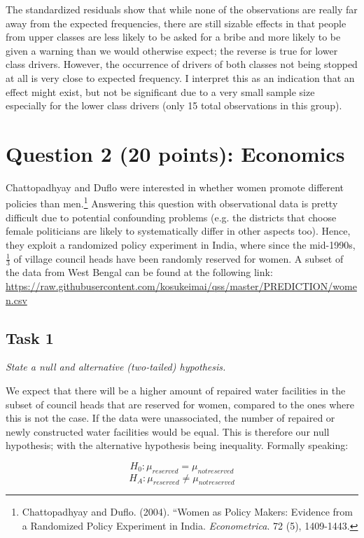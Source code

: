 \documentclass[12pt,a4paper]{article}
\begin{document}
The standardized residuals show that while none of the observations are really far away from the expected frequencies, there are still sizable effects in that people from upper classes are less likely to be asked for a bribe and more likely to be given a warning than we would otherwise expect; the reverse is true for lower class drivers. However, the occurrence of drivers of both classes not being stopped at all is very close to expected frequency. I interpret this as an indication that an effect might exist, but not be significant due to a very small sample size especially for the lower class drivers (only 15 total observations in this group).

\newpage
\section*{Question 2 (20 points): Economics}
Chattopadhyay and Duflo were interested in whether women promote different policies than men.\footnote{Chattopadhyay and Duflo. (2004). ``Women as Policy Makers: Evidence from a Randomized Policy Experiment in India. \textit{Econometrica}. 72 (5), 1409-1443.} Answering this question with observational data is pretty difficult due to potential confounding problems (e.g. the districts that choose female politicians are likely to systematically differ in other aspects too). Hence, they exploit a randomized policy experiment in India, where since the mid-1990s, $\frac{1}{3}$ of village council heads have been randomly reserved for women. A subset of the data from West Bengal can be found at the following link: \url{https://raw.githubusercontent.com/kosukeimai/qss/master/PREDICTION/women.csv}

\subsection*{Task 1}
\textit{State a null and alternative (two-tailed) hypothesis.}

We expect that there will be a higher amount of repaired water facilities in the subset of council heads that are reserved for women, compared to the ones where this is not the case. If the data were unassociated, the number of repaired or newly constructed water facilities would be equal. This is therefore our null hypothesis; with the alternative hypothesis being inequality. Formally speaking:

	\[H_{0}: \mu_{reserved} = \mu_{not reserved}\] 
	\[H_{A}: \mu_{reserved} \neq \mu_{not reserved}\]
	
\end{document}
